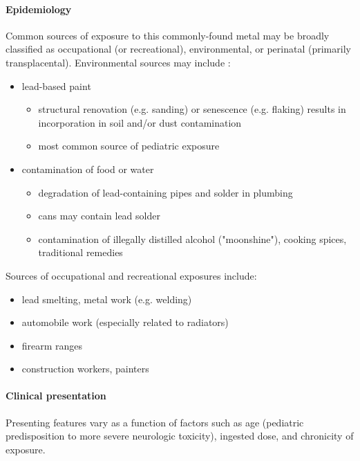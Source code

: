 \paragraph{Epidemiology}

Common sources of exposure to this commonly-found metal may be broadly classified as occupational (or recreational), environmental, or perinatal (primarily transplacental). Environmental sources may include :

\begin{itemize}
	\item
	lead-based paint
	
	\begin{itemize}
		\item
		structural renovation (e.g. sanding) or senescence (e.g. flaking) results in incorporation in soil and/or dust contamination
		\item
		most common source of pediatric exposure
	\end{itemize}
	\item
	contamination of food or water
	
	\begin{itemize}
		\item
		degradation of lead-containing pipes and solder in plumbing
		\item
		cans may contain lead solder
		\item
		contamination of illegally distilled alcohol ("moonshine"), cooking spices, traditional remedies
	\end{itemize}
\end{itemize}

Sources of occupational and recreational exposures include:

\begin{itemize}
	\item
	lead smelting, metal work (e.g. welding)
	\item
	automobile work (especially related to radiators)
	\item
	firearm ranges
	\item
	construction workers, painters
\end{itemize}

\paragraph{Clinical presentation}

Presenting features vary as a function of factors such as age (pediatric predisposition to more severe neurologic toxicity), ingested dose, and chronicity of exposure.

